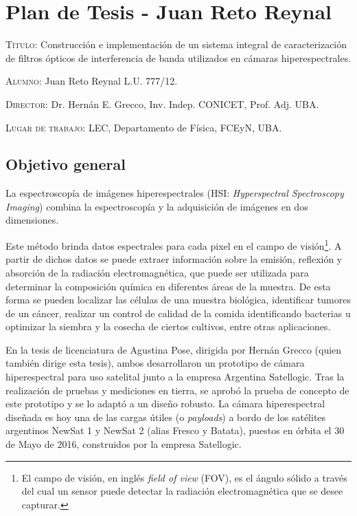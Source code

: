 \documentclass{ctuthesis}
\begin{document}
\maketitle
\renewcommand{\chaptername}{Capítulo}
\renewcommand{\figurename}{Figura}
\chapter*{Plan de Tesis - Juan Reto Reynal}


\textsc{Título:} Construcción e implementación de un sistema integral de 
caracterización de filtros ópticos de interferencia de banda utilizados en 
cámaras 
hiperespectrales.


\hspace{-0.4cm}\textsc{Alumno:} Juan Reto Reynal L.U. 777/12.

\hspace{-0.4cm}\textsc{Director:} Dr. Hernán E. Grecco, Inv. Indep. CONICET, 
Prof. Adj. UBA.

\hspace{-0.4cm}\textsc{Lugar de trabajo:} LEC, Departamento de Física, FCEyN, UBA.


\section*{Objetivo general}
La espectroscopía de imágenes hiperespectrales (HSI: 
\textit{Hyperspectral Spectroscopy Imaging}) combina la 
espectroscopía 
y la 
adquisición de 
imágenes en dos dimensiones. 

Este método brinda datos espectrales para cada 
pixel en el campo de 
visión\footnote{El campo de visión, en inglés \textit{field of view} (FOV), es 
el ángulo sólido a través del cual un sensor puede detectar la radiación 
electromagnética que se desee capturar.}. A partir de dichos 
datos se puede extraer información sobre la emisión, reflexión y absorción de 
la radiación electromagnética, que puede ser utilizada para determinar la 
composición química en diferentes áreas de la muestra. De esta forma se pueden 
localizar las células de una muestra biológica, identificar 
tumores de un cáncer, realizar un control de calidad de la comida identificando 
bacterias u optimizar la siembra y la cosecha de ciertos cultivos, entre otras 
aplicaciones.


En la tesis de licenciatura de Agustina Pose, dirigida por Hernán Grecco (quien 
también dirige esta tesis), ambos desarrollaron un prototipo de cámara 
hiperespectral para uso satelital junto a la empresa Argentina Satellogic. Tras 
la realización de pruebas y mediciones en tierra, se aprobó la prueba de 
concepto de este prototipo y se lo adaptó a un diseño robusto. La cámara 
hiperespectral diseñada es hoy una de las cargas útiles (o \textit{payloads}) a 
bordo de los satélites argentinos NewSat 1 y NewSat 2 (alias Fresco y Batata), 
puestos en órbita el 30 de Mayo de 2016, construidos por la empresa Satellogic.
\end{document}
